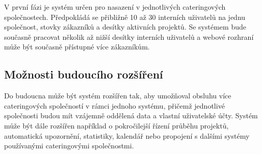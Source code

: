 V první fázi je systém určen pro nasazení v jednotlivých cateringových společnostech. Předpokládá se přibližně 10 až 30 interních uživatelů na jednu společnost, stovky zákazníků a desítky aktivních projektů. Se systémem bude současně pracovat několik až nižší desítky interních uživatelů a webové rozhraní může být současně přístupné více zákazníkům.

\subsection{Možnosti budoucího rozšíření}

Do budoucna může být systém rozšířen tak, aby umožňoval obsluhu více cateringových společností v rámci jednoho systému, přičemž jednotlivé společnosti budou mít vzájemně oddělená data a vlastní uživatelské účty. Systém může být dále rozšířen například o pokročilejší řízení průběhu projektů, automatická upozornění, statistiky, kalendář nebo propojení s dalšími systémy používanými cateringovými společnostmi.
